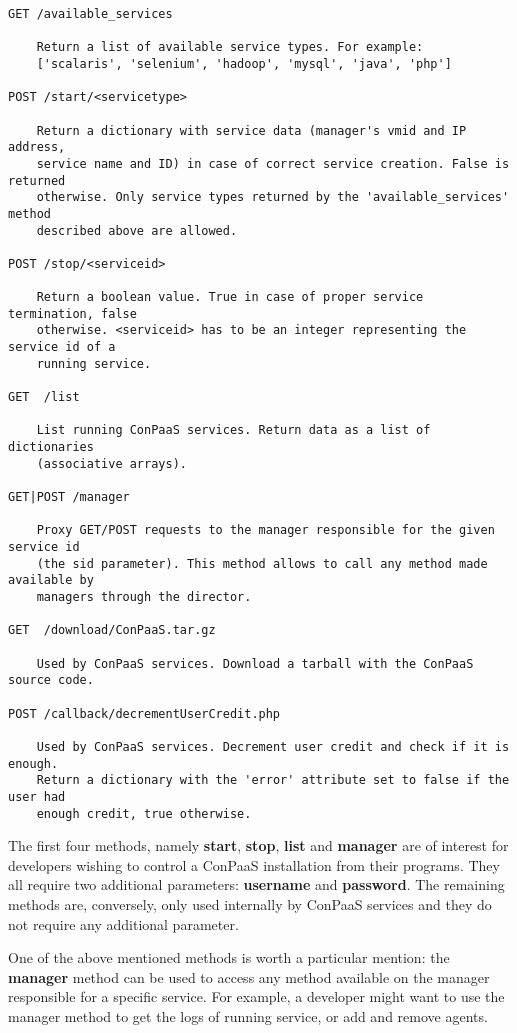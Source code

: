 \documentclass[10pt]{article}
\begin{document}
\begin{verbatim}
GET /available_services

    Return a list of available service types. For example: 
    ['scalaris', 'selenium', 'hadoop', 'mysql', 'java', 'php']

POST /start/<servicetype>

    Return a dictionary with service data (manager's vmid and IP address,
    service name and ID) in case of correct service creation. False is returned
    otherwise. Only service types returned by the 'available_services' method
    described above are allowed.

POST /stop/<serviceid>

    Return a boolean value. True in case of proper service termination, false
    otherwise. <serviceid> has to be an integer representing the service id of a
    running service.

GET  /list

    List running ConPaaS services. Return data as a list of dictionaries
    (associative arrays).

GET|POST /manager

    Proxy GET/POST requests to the manager responsible for the given service id
    (the sid parameter). This method allows to call any method made available by
    managers through the director.

GET  /download/ConPaaS.tar.gz

    Used by ConPaaS services. Download a tarball with the ConPaaS source code.

POST /callback/decrementUserCredit.php
    
    Used by ConPaaS services. Decrement user credit and check if it is enough.
    Return a dictionary with the 'error' attribute set to false if the user had
    enough credit, true otherwise.
\end{verbatim}

The first four methods, namely \textbf{start}, \textbf{stop}, \textbf{list} and
\textbf{manager} are of interest for developers wishing to control a ConPaaS
installation from their programs. They all require two additional parameters:
\textbf{username} and \textbf{password}. The remaining methods are, conversely,
only used internally by ConPaaS services and they do not require any additional
parameter. 

One of the above mentioned methods is worth a particular mention: the
\textbf{manager} method can be used to access any method available on the
manager responsible for a specific service. For example, a developer might want
to use the manager method to get the logs of running service, or add and remove
agents. 
\end{document}
